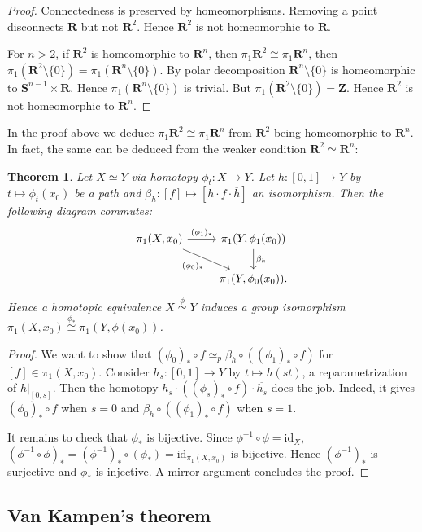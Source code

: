 \documentclass[11pt]{article}
\theoremstyle{definition}
\theoremstyle{plain}
\newtheorem{theorem}{Theorem}[section]
\theoremstyle{remark}
\newcommand{\id}{\textrm{id}}
\newcommand{\R}{\mathbf{R}}
\newcommand{\Z}{\mathbf{Z}}
\begin{document}
\begin{proof}
Connectedness is preserved by homeomorphisms. Removing a point disconnects $\R$ but not $\R^2$. Hence $\R^2$ is not homeomorphic to $\R$.\medbreak

For $n>2$, if $\R^2$ is homeomorphic to $\R^n$, then $\pi_1\R^2\cong\pi_1\R^n$, then $\pi_1(\R^2\setminus\{0\})=\pi_1(\R^n\setminus\{0\})$. By polar decomposition $\R^n\setminus\{0\}$ is homeomorphic to $\mathbf{S}^{n-1}\times\R$. Hence $\pi_1(\R^n\setminus\{0\})$ is trivial. But $\pi_1(\R^2\setminus\{0\})=\Z$. Hence $\R^2$ is not homeomorphic to $\R^n$.
\end{proof}

In the proof above we deduce $\pi_1\R^2\cong\pi_1\R^n$ from $\R^2$ being homeomorphic to $\R^n$. In fact, the same can be deduced from the weaker condition $\R^2\simeq\R^n$:

\begin{theorem}
Let $X\simeq Y$ via homotopy $\phi_t:X\to Y$. Let $h:[0,1]\to Y$ by $t\mapsto\phi_t(x_0)$ be a path and $\beta_h:[f]\mapsto[h\cdot f\cdot\overline{h}]$ an isomorphism. Then the following diagram commutes:
\[\begin{tikzcd}
\pi_1(X,x_0)\arrow[swap]{dr}{(\phi_0)_\ast}\arrow{r}{(\phi_1)_\ast}&\pi_1(Y,\phi_1(x_0))\arrow{d}{\beta_h}\\
&\pi_1(Y,\phi_0(x_0)).
\end{tikzcd}\]
Hence a homotopic equivalence $X\stackrel{\text{$\phi$}}{\simeq}Y$ induces a group isomorphism $\pi_1(X,x_0)\stackrel{\text{$\phi_\ast$}}{\cong}\pi_1(Y,\phi(x_0))$.
\end{theorem}
\begin{proof}
We want to show that $(\phi_0)_\ast\circ f\simeq_p\beta_h\circ((\phi_1)_\ast\circ f)$ for $[f]\in\pi_1(X,x_0)$. Consider $h_s:[0,1]\to Y$ by $t\mapsto h(st)$, a reparametrization of $h|_{[0,s]}$. Then the homotopy $h_s\cdot((\phi_s)_\ast\circ f)\cdot\overline{h_s}$ does the job. Indeed, it gives $(\phi_0)_\ast\circ f$ when $s=0$ and $\beta_h\circ((\phi_1)_\ast\circ f)$ when $s=1$.\medbreak

It remains to check that $\phi_\ast$ is bijective. Since $\phi^{-1}\circ\phi=\id_X$, $(\phi^{-1}\circ\phi)_\ast=(\phi^{-1})_\ast\circ(\phi_\ast)=\id_{\pi_1(X,x_0)}$ is bijective. Hence $(\phi^{-1})_\ast$ is surjective and $\phi_\ast$ is injective. A mirror argument concludes the proof.
\end{proof}

\subsection{Van Kampen's theorem}\label{7}
\end{document}
